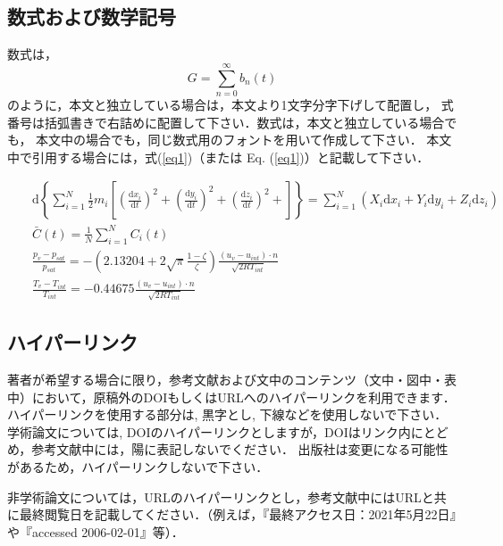 \documentclass[main]{subfiles}
\begin{document}
    \subsection{数式および数学記号}
    
        数式は，
        \begin{equation}
            G=\sum^{\infty}_{n=0} b_n(t)
            \label{eq1}
        \end{equation}
        のように，本文と独立している場合は，本文より1文字分字下げして配置し，
        式番号は括弧書きで右詰めに配置して下さい．数式は，本文と独立している場合でも，
        本文中の場合でも，同じ数式用のフォントを用いて作成して下さい．
        本文中で引用する場合には，式(\ref{eq1})（または Eq. (\ref{eq1})）と記載して下さい．
    
        \begin{align}
            &&\mbox{d}\left\{\sum^N_{i=1}\frac{1}{2}m_i\left[\left(\frac{\mbox{d}x_i}{\mbox{d}t}\right)^2+\left(\frac{\mbox{d}y_i}{\mbox{d}t}\right)^2+\left(\frac{\mbox{d}z_i}{\mbox{d}t}\right)^2+\right]\right\}=\sum^N_{i=1}(X_i\mbox{d}x_i+Y_i\mbox{d}y_i+Z_i\mbox{d}z_i)\\
            &&\bar{C}(t)=\frac{1}{N}\sum^N_{i=1}C_i(t)\\
            &&\frac{p_v-p_{sat}}{p_{sat}}=-\left(2.13204+2\sqrt{\pi}\frac{1-\zeta}{\zeta}\right)\frac{(u_v-u_{int})\cdot n}{\sqrt{2RT_{int}}}\\
            &&\frac{T_v-T_{int}}{T_{int}}=-0.44675\frac{(u_v-u_{int})\cdot n}{\sqrt{2RT_{int}}}
        \end{align}


    \subsection{ハイパーリンク}
    
        著者が希望する場合に限り，参考文献および文中のコンテンツ（文中・図中・表中）において，原稿外のDOIもしくはURLへのハイパーリンクを利用できます．
        ハイパーリンクを使用する部分は, 黒字とし, 下線などを使用しないで下さい．
        学術論文については, DOIのハイパーリンクとしますが，DOIはリンク内にとどめ，参考文献中には，陽に表記しないでください．
        出版社は変更になる可能性があるため，ハイパーリンクしないで下さい．
    
        非学術論文については，URLのハイパーリンクとし，参考文献中にはURLと共に最終閲覧日を記載してください．（例えば，『最終アクセス日：2021年5月22日』や『accessed 2006-02-01』等）．\\
    
\end{document}

